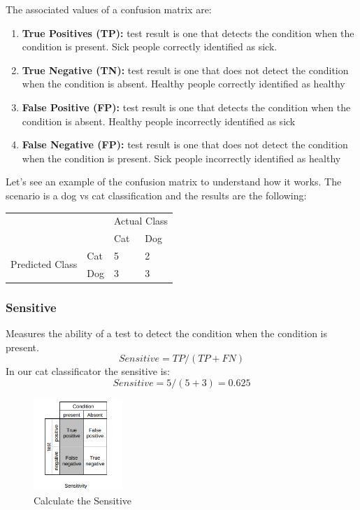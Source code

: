 The associated values of a confusion matrix are:

\begin{enumerate}
\item \textbf{True Positives (TP):} test result is one that detects the condition when the
condition is present. Sick people correctly identified as sick.
\item \textbf{True Negative (TN):} test result is one that does not detect the condition when
the condition is absent. Healthy people correctly identified as healthy
\item \textbf{False Positive (FP):} test result is one that detects the condition when the
condition is absent. Healthy people incorrectly identified as sick
\item \textbf{False Negative (FP):} test result is one that does not detect the condition when
the condition is present. Sick people incorrectly identified as healthy
\end{enumerate}


Let's see an example of the confusion matrix to understand how it works. 
The scenario is a dog vs cat classification and the results are the following:
\begin{table}[H]
\centering
\begin{tabular}{llll}
\multicolumn{2}{l}{}                   & \multicolumn{2}{l}{Actual Class}  \\
\multicolumn{2}{l}{}                   & Cat & Dog                         \\
\multirow{2}{*}{Predicted Class} & Cat & 5   & 2                           \\
                                 & Dog & 3   & 3                          
\end{tabular}
\end{table}

\subsubsection[Sensitive]{Sensitive}
Measures the ability of a test to detect the condition when the condition is present.
\[ Sensitive = TP/(TP+FN) \]
In our cat classificator the sensitive is:
\[ Sensitive = 5/(5+3) = 0.625 \]

\begin{figure}[H]
\centering
\includegraphics[width=0.3\textwidth]{./figures/Sensitive}
\caption{Calculate the Sensitive}
\end{figure}

